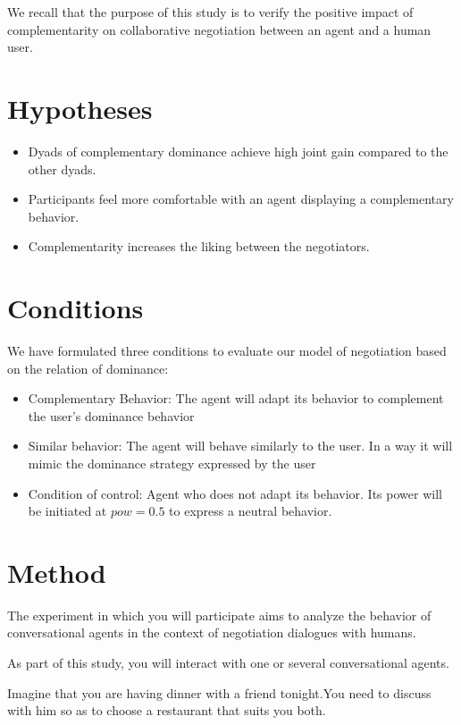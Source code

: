 \documentclass [french]{paper}
\begin{document}
		
	We recall that the purpose of this study is to verify the positive impact of complementarity on collaborative negotiation between an agent and a human user.
	
	\section{Hypotheses}
	\begin{itemize}
		\item Dyads of complementary dominance achieve high joint gain compared to the other dyads.
		\item Participants feel more comfortable with an agent displaying a complementary behavior.
		\item Complementarity increases the liking between the negotiators.
	\end{itemize}
			
	\section{Conditions}
		We have formulated three conditions to evaluate our model of negotiation based on the relation of dominance:
			\begin{itemize}
			\item Complementary Behavior: The agent will adapt its behavior to complement the user's dominance behavior
			
			\item Similar behavior: The agent will behave similarly to the user. In a way it will mimic the dominance strategy expressed by the user
			
			\item Condition of control: Agent who does not adapt its behavior. Its power will be initiated at $ pow = 0.5 $ to express a neutral behavior.
		\end{itemize}
		
		
	\section{Method}
		The experiment in which you will participate aims to analyze the behavior of conversational agents in the context of negotiation dialogues with  humans.
		
		As part of this study, you will interact with one or several conversational agents.
		
		Imagine that you are having dinner with a friend tonight.You need to discuss with him so as to choose a restaurant that suits you both.
		
\end{document}

